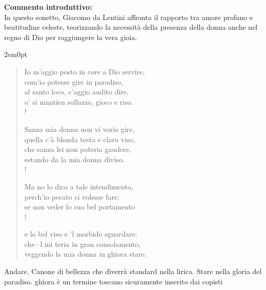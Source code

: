 \newpage
\hypertarget{para:postoincore}{}


\textbf{Commento introduttivo:}\\
In questo sonetto, Giacomo da Lentini affronta il rapporto tra amore profano e beatitudine celeste, teorizzando la necessità della presenza della donna anche nel regno di Dio per raggiungere la vera gioia.

\vspace{1.5em}

\begin{adjustwidth}{2em}{0pt}
\verselinenumbersleft
\begin{verse}
Io m’aggio posto in core a Dio servire, \label{posto1}\\
com’io potesse gire in paradiso, \label{posto2}\\
al santo loco, c’aggio audito dire, \\
o’ si mantien sollazzo, gioco e riso. \label{posto4}\\!

     Sanza mia donna non vi voria gire, \\
quella c’à blonda testa e claro viso, \label{posto6}\\
che sanza lei non poteria gaudere, \\ 
estando da la mia donna diviso. \\!

     Ma no lo dico a tale intendimento, \\
perch’io pecato ci volesse fare; \\
se non veder lo suo bel portamento \\!

     e lo bel viso e ’l morbido sguardare: \\
che·l mi teria in gran consolamento, \\
veggendo la mia donna in ghiora stare. \label{posto14}\\
\end{verse}
\end{adjustwidth}

\vspace{1.5em}

\begin{commentaries}
    \scolio[\ref{posto2}]{gire} Andare.
    \scolio[\ref{posto6}]{blonda testa...} Canone di bellezza che diverrà standard nella lirica.
    \scolio[\ref{posto14}]{In ghiora stare} Stare nella gloria del paradiso. ghiora è un termine toscano sicuramente inserito dai copisti
\end{commentaries}

